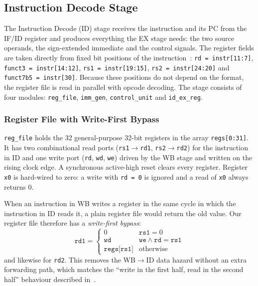 \subsection{Instruction Decode Stage}
\label{sec:id_stage}

The Instruction Decode (ID) stage receives the instruction and its PC from the
IF/ID register and produces everything the EX stage needs: the two source
operands, the sign-extended immediate and the control signals. The register
fields are taken directly from fixed bit positions of the
instruction~\cite{ym_riscv_spec}: \texttt{rd = instr[11:7]},
\texttt{funct3 = instr[14:12]}, \texttt{rs1 = instr[19:15]},
\texttt{rs2 = instr[24:20]} and \texttt{funct7b5 = instr[30]}. Because these
positions do not depend on the format, the register file is read in parallel
with opcode decoding. The stage consists of four modules: \texttt{reg\_file},
\texttt{imm\_gen}, \texttt{control\_unit} and \texttt{id\_ex\_reg}.

\subsubsection{Register File with Write-First Bypass}
\texttt{reg\_file} holds the 32 general-purpose 32-bit registers in the array
\texttt{regs[0:31]}. It has two combinational read ports
(\texttt{rs1}$\rightarrow$\texttt{rd1}, \texttt{rs2}$\rightarrow$\texttt{rd2})
for the instruction in ID and one write port (\texttt{rd}, \texttt{wd},
\texttt{we}) driven by the WB stage and written on the rising clock edge. A
synchronous active-high reset clears every register. Register \texttt{x0} is
hard-wired to zero: a write with \texttt{rd = 0} is ignored and a read of
\texttt{x0} always returns 0.

When an instruction in WB writes a register in the same cycle in which the
instruction in ID reads it, a plain register file would return the old value.
Our register file therefore has a \emph{write-first bypass}:
\[
\texttt{rd1} = \left\{
\begin{array}{ll}
0 & \texttt{rs1} = 0\\
\texttt{wd} & \texttt{we} \land \texttt{rd} = \texttt{rs1}\\
\texttt{regs[rs1]} & \mbox{otherwise}
\end{array}
\right.
\]
and likewise for \texttt{rd2}. This removes the WB$\rightarrow$ID data hazard
without an extra forwarding path, which matches the ``write in the first half,
read in the second half'' behaviour described in~\cite{ym_patterson_cod_riscv}.

